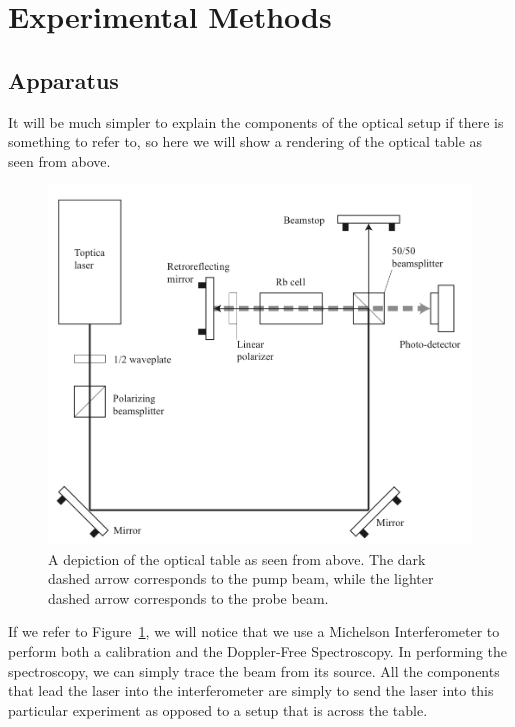 \documentclass{article}
\begin{document}
\section{Experimental Methods}
  \subsection{Apparatus}
  It will be much simpler to explain the components of the optical setup if there is something to refer to, so here we will show a rendering of the optical table as seen from above.

  \begin{figure}
    \centering
    \includegraphics[scale=.25]{hyperfine_apparatus.png}
    \caption{A depiction of the optical table as seen from above.  The dark dashed arrow corresponds to the pump beam, while the lighter dashed arrow corresponds to the probe beam.}
    \label{apparatus}
  \end{figure}

  If we refer to Figure~\ref{apparatus}, we will notice that we use a Michelson Interferometer to perform both a calibration and the Doppler-Free Spectroscopy.  In performing the spectroscopy, we can simply trace the beam from its source.  All the components that lead the laser into the interferometer are simply to send the laser into this particular experiment as opposed to a setup that is across the table.

  \hspace{.25cm}
\end{document}
